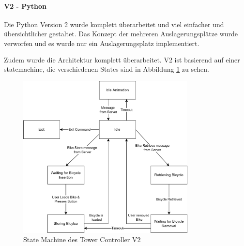 \paragraph{V2 - Python}
Die Python Version 2 wurde komplett überarbeitet und viel einfacher und übersichtlicher gestaltet. Das Konzept der mehreren Auslagerungsplätze wurde verworfen und es wurde nur ein Auslagerungsplatz implementiert.

Zudem wurde die Architektur komplett überarbeitet. V2 ist basierend auf einer \Gls{statemachine}, die verschiedenen States sind in Abbildung \ref{fig:tower_controller_v1_state_machine} zu sehen.

\begin{figure}
  \centering
  \includegraphics[width=0.8\textwidth]{images/tower_controller_v2_state_machine.png}
  \caption{State Machine des Tower Controller V2}
  \label{fig:tower_controller_v1_state_machine}
\end{figure}

